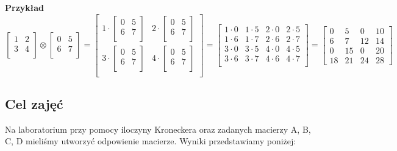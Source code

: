 \documentclass[a4paper]{article}
\begin{document}
		\textbf{Przykład}
	$$\begin{bmatrix}1&2\\3&4\\\end{bmatrix}\otimes {\begin{bmatrix}0&5\\6&7\\\end{bmatrix}}={\begin{bmatrix}1\cdot {\begin{bmatrix}0&5\\6&7\\\end{bmatrix}}&2\cdot {\begin{bmatrix}0&5\\6&7\\\end{bmatrix}}\\3\cdot {\begin{bmatrix}0&5\\6&7\\\end{bmatrix}}&4\cdot {\begin{bmatrix}0&5\\6&7\\\end{bmatrix}}\\\end{bmatrix}}={\begin{bmatrix}1\cdot 0&1\cdot 5&2\cdot 0&2\cdot 5\\1\cdot 6&1\cdot 7&2\cdot 6&2\cdot 7\\3\cdot 0&3\cdot 5&4\cdot 0&4\cdot 5\\3\cdot 6&3\cdot 7&4\cdot 6&4\cdot 7\\\end{bmatrix}}={\begin{bmatrix}0&5&0&10\\6&7&12&14\\0&15&0&20\\18&21&24&28\end{bmatrix}}$$
	
\subsection{Cel zajęć}
Na laboratorium przy pomocy iloczyny Kroneckera oraz zadanych macierzy A, B, C, D mieliśmy utworzyć odpowienie macierze. Wyniki przedstawiamy poniżej:
\end{document}
